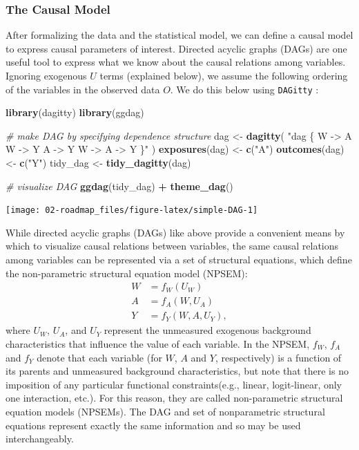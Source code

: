 \documentclass[12pt, krantz2,]{krantz}
\newenvironment{Shaded}{\begin{snugshade}}{\end{snugshade}}
\newcommand{\CommentTok}[1]{\textcolor[rgb]{0.37,0.37,0.37}{\textit{#1}}}
\newcommand{\KeywordTok}[1]{\textcolor[rgb]{0.27,0.27,0.27}{\textbf{#1}}}
\newcommand{\NormalTok}[1]{#1}
\newcommand{\OperatorTok}[1]{\textcolor[rgb]{0.43,0.43,0.43}{\textbf{#1}}}
\newcommand{\StringTok}[1]{\textcolor[rgb]{0.5,0.5,0.5}{#1}}
\theoremstyle{definition}
\theoremstyle{definition}
\theoremstyle{definition}
\newcommand{\1}{\mathbbm{1}}
\begin{document}
\hypertarget{the-causal-model}{%
\subsubsection*{The Causal Model}\label{the-causal-model}}


After formalizing the data and the statistical model, we can define a causal
model to express causal parameters of interest. Directed acyclic graphs (DAGs)
are one useful tool to express what we know about the causal relations among
variables. Ignoring exogenous \(U\) terms (explained below), we assume the
following ordering of the variables in the observed data \(O\). We do this below
using \texttt{DAGitty} \citep{textor2011dagitty}:

\begin{Shaded}
\begin{Highlighting}[]
\KeywordTok{library}\NormalTok{(dagitty)}
\KeywordTok{library}\NormalTok{(ggdag)}

\CommentTok{# make DAG by specifying dependence structure}
\NormalTok{dag <-}\StringTok{ }\KeywordTok{dagitty}\NormalTok{(}
  \StringTok{"dag \{}
\StringTok{    W -> A}
\StringTok{    W -> Y}
\StringTok{    A -> Y}
\StringTok{    W -> A -> Y}
\StringTok{  \}"}
\NormalTok{)}
\KeywordTok{exposures}\NormalTok{(dag) <-}\StringTok{ }\KeywordTok{c}\NormalTok{(}\StringTok{"A"}\NormalTok{)}
\KeywordTok{outcomes}\NormalTok{(dag) <-}\StringTok{ }\KeywordTok{c}\NormalTok{(}\StringTok{"Y"}\NormalTok{)}
\NormalTok{tidy_dag <-}\StringTok{ }\KeywordTok{tidy_dagitty}\NormalTok{(dag)}

\CommentTok{# visualize DAG}
\KeywordTok{ggdag}\NormalTok{(tidy_dag) }\OperatorTok{+}
\StringTok{  }\KeywordTok{theme_dag}\NormalTok{()}
\end{Highlighting}
\end{Shaded}

\begin{center}\texttt{[image: 02-roadmap\_files/figure-latex/simple-DAG-1]} \end{center}

While directed acyclic graphs (DAGs) like above provide a convenient means by
which to visualize causal relations between variables, the same causal relations
among variables can be represented via a set of structural equations, which
define the non-parametric structural equation model (NPSEM):
\begin{align*}
  W &= f_W(U_W) \\
  A &= f_A(W, U_A) \\
  Y &= f_Y(W, A, U_Y),
\end{align*}
where \(U_W\), \(U_A\), and \(U_Y\) represent the unmeasured exogenous background
characteristics that influence the value of each variable. In the NPSEM, \(f_W\),
\(f_A\) and \(f_Y\) denote that each variable (for \(W\), \(A\) and \(Y\), respectively)
is a function of its parents and unmeasured background characteristics, but note
that there is no imposition of any particular functional constraints(e.g.,
linear, logit-linear, only one interaction, etc.). For this reason, they are
called non-parametric structural equation models (NPSEMs). The DAG and set of
nonparametric structural equations represent exactly the same information and so
may be used interchangeably.
\end{document}
